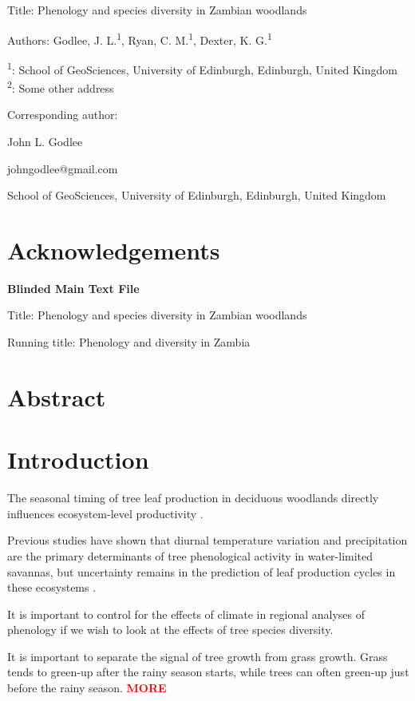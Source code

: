 \documentclass[11pt,a4paper]{article}
\newcommand{\todo}[1]{\textcolor{red}{\textbf{#1}}}   %
\newcommand{\titletext}{Phenology and species diversity in Zambian woodlands}
\begin{document}
{\LARGE{Title: \titletext}}

\vspace{1cm}

Authors: Godlee, J. L.\textsuperscript{1}, Ryan, C. M.\textsuperscript{1}, Dexter, K. G.\textsuperscript{1}

\textsuperscript{1}: School of GeoSciences, University of Edinburgh, Edinburgh, United Kingdom \\
\textsuperscript{2}: Some other address

\vspace{1em}
Corresponding author:

John L. Godlee

johngodlee@gmail.com

School of GeoSciences, University of Edinburgh, Edinburgh, United Kingdom

\section{Acknowledgements}

\newpage{}

{\LARGE{\textbf{Blinded Main Text File}}}

\LARGE{Title: \titletext}

\normalsize{Running title: Phenology and diversity in Zambia}

\section{Abstract}

\section{Introduction}

The seasonal timing of tree leaf production in deciduous woodlands directly influences ecosystem-level productivity \citep{}. 

Previous studies have shown that diurnal temperature variation and precipitation are the primary determinants of tree phenological activity in water-limited savannas, but uncertainty remains in the prediction of leaf production cycles in these ecosystems \citep{}. 

It is important to control for the effects of climate in regional analyses of phenology if we wish to look at the effects of tree species diversity.

It is important to separate the signal of tree growth from grass growth. Grass tends to green-up after the rainy season starts, while trees can often green-up just before the rainy season. \todo{MORE}
\end{document}
